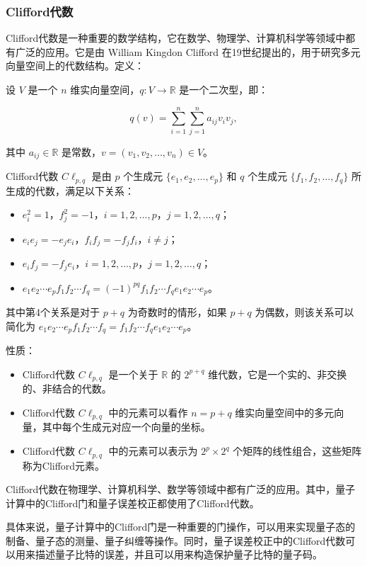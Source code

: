 \documentclass[UTF8,a4paper,11pt]{article}
\begin{document}
\subsubsection{Clifford代数}
Clifford代数是一种重要的数学结构，它在数学、物理学、计算机科学等领域中都有广泛的应用。它是由 William Kingdon Clifford 在19世纪提出的，用于研究多元向量空间上的代数结构。定义：

设 $V$ 是一个 $n$ 维实向量空间，$q: V \rightarrow \mathbb{R}$ 是一个二次型，即：

$$
q(v) = \sum_{i=1}^n\sum_{j=1}^na_{ij}v_iv_j,
$$

其中 $a_{ij} \in \mathbb{R}$ 是常数，$v = (v_1, v_2, \ldots, v_n) \in V$。

Clifford代数 $C\ell_{p,q}$ 是由 $p$ 个生成元 $\{e_1, e_2, \ldots, e_p\}$ 和 $q$ 个生成元 $\{f_1, f_2, \ldots, f_q\}$ 所生成的代数，满足以下关系：
\begin{itemize}
\item $e_i^2 = 1$，$f_j^2 = -1$，$i=1,2,\ldots,p$，$j=1,2,\ldots,q$；
\item $e_ie_j = -e_je_i$，$f_if_j = -f_jf_i$，$i\neq j$；
\item $e_if_j = -f_je_i$，$i=1,2,\ldots,p$，$j=1,2,\ldots,q$；
\item $e_1e_2\cdots e_p f_1f_2\cdots f_q = (-1)^{pq}f_1f_2\cdots f_q e_1e_2\cdots e_p$。
\end{itemize}
其中第4个关系是对于 $p+q$ 为奇数时的情形，如果 $p+q$ 为偶数，则该关系可以简化为 $e_1e_2\cdots e_p f_1f_2\cdots f_q = f_1f_2\cdots f_q e_1e_2\cdots e_p$。

性质：
\begin{itemize}
\item Clifford代数 $C\ell_{p,q}$ 是一个关于 $\mathbb{R}$ 的 $2^{p+q}$ 维代数，它是一个实的、非交换的、非结合的代数。
\item Clifford代数 $C\ell_{p,q}$ 中的元素可以看作 $n=p+q$ 维实向量空间中的多元向量，其中每个生成元对应一个向量的坐标。
\item Clifford代数 $C\ell_{p,q}$ 中的元素可以表示为 $2^p \times 2^q$ 个矩阵的线性组合，这些矩阵称为Clifford元素。
\end{itemize}

Clifford代数在物理学、计算机科学、数学等领域中都有广泛的应用。其中，量子计算中的Clifford门和量子误差校正都使用了Clifford代数。

具体来说，量子计算中的Clifford门是一种重要的门操作，可以用来实现量子态的制备、量子态的测量、量子纠缠等操作。同时，量子误差校正中的Clifford代数可以用来描述量子比特的误差，并且可以用来构造保护量子比特的量子码。
\end{document}
